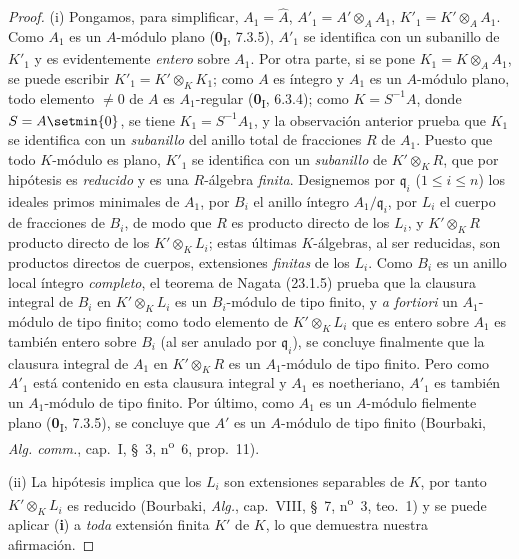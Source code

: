 \begin{proof}
(i) Pongamos, para simplificar, $A_1=\widehat A$,
$A'_1=A'\otimes_AA_1$, $K'_1=K'\otimes_AA_1$. Como $A_1$ es un
$A$-módulo plano (\textbf{0}\textsubscript{I}, 7.3.5), $A'_1$ se identifica con un
subanillo de $K'_1$ y es evidentemente \emph{entero} sobre $A_1$. Por otra parte, si
se pone $K_1=K\otimes_AA_1$, se puede escribir
$K'_1=K'\otimes_KK_1$; como $A$ es íntegro y $A_1$ es un $A$-módulo
plano, todo elemento $\neq0$ de $A$ es $A_1$-regular
(\textbf{0}\textsubscript{I}, 6.3.4); como $K=S^{-1}A$, donde $S=A\setmin\{0\}$, se tiene
$K_1=S^{-1}A_1$, y la observación anterior prueba que $K_1$ se identifica con un
\emph{subanillo} del anillo total de fracciones $R$ de $A_1$. Puesto que todo
$K$-módulo es plano, $K'_1$ se identifica con un \emph{subanillo} de $K'\otimes_KR$,
que por hipótesis es \emph{reducido} y es una $R$-álgebra \emph{finita}. Designemos por
$\mathfrak q_i$ ($1\leqslant i\leqslant n$) los ideales primos minimales de
$A_1$, por $B_i$ el anillo íntegro $A_1/\mathfrak q_i$, por $L_i$ el cuerpo de
fracciones de $B_i$, de modo que $R$ es producto directo de los $L_i$, y
$K'\otimes_KR$ producto directo de los $K'\otimes_KL_i$; estas últimas
$K$-álgebras, al ser reducidas, son productos directos de cuerpos,
extensiones \emph{finitas} de los $L_i$. Como $B_i$ es un anillo local íntegro
\emph{completo}, el teorema de Nagata (23.1.5) prueba que la clausura
integral de $B_i$ en $K'\otimes_KL_i$ es un $B_i$-módulo de tipo finito, y
\emph{a fortiori} un $A_1$-módulo de tipo finito; como todo elemento de
$K'\otimes_KL_i$ que es entero sobre $A_1$ es también entero sobre $B_i$ (al ser
anulado por $\mathfrak q_i$), se concluye finalmente que la clausura
integral de $A_1$ en $K'\otimes_KR$ es un $A_1$-módulo de tipo finito. Pero
como $A'_1$ está contenido en esta clausura integral y $A_1$ es
noetheriano, $A'_1$ es también un $A_1$-módulo de tipo finito. Por último, como $A_1$
es un $A$-módulo fielmente plano (\textbf{0}\textsubscript{I}, 7.3.5), se concluye
que $A'$ es un $A$-módulo de tipo finito (Bourbaki, \emph{Alg. comm.},
cap.~I, §~3, n\textsuperscript{o}~6, prop.~11).


(ii) La hipótesis implica que los $L_i$ son extensiones separables
de $K$, por tanto $K'\otimes_KL_i$ es reducido (Bourbaki, \emph{Alg.}, cap.~VIII,
§~7, n\textsuperscript{o}~3, teo.~1) y se puede aplicar (\textbf{i}) a \emph{toda}
extensión finita $K'$ de $K$, lo que demuestra nuestra afirmación.
\end{proof}

